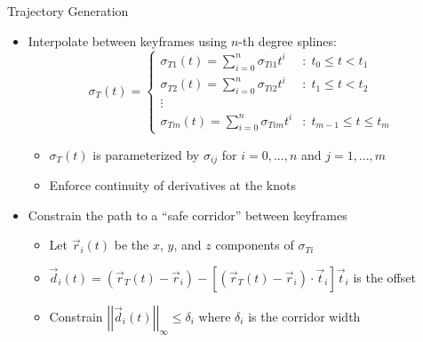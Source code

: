 \documentclass[onlymath]{beamer}
\begin{document}
\begin{frame}{Trajectory Generation}
    \begin{itemize}
    \item Interpolate between keyframes using $n$-th degree splines:
    \begin{equation*}
        \sigma_T(t) = \begin{cases}
            \sigma_{T1}(t) = \sum_{i = 0}^n \sigma_{Ti1} t^i & :\; t_0 \le t < t_1 \\
            \sigma_{T2}(t) = \sum_{i = 0}^n \sigma_{Ti2} t^i & :\; t_1 \le t < t_2 \\
            \vdots & \\
            \sigma_{Tm}(t) = \sum_{i = 0}^n \sigma_{Tim} t^i & :\; t_{m-1} \le t \le t_m
        \end{cases}
    \end{equation*}
        \begin{itemize}
        \item $\sigma_T(t)$ is parameterized by $\sigma_{ij}$ for $i = 0, ..., n$ and $j = 1, ..., m$
        \item Enforce continuity of derivatives at the knots
        \end{itemize}
    \item Constrain the path to a ``safe corridor'' between keyframes
        \begin{itemize}
        \item Let $\vec{r}_i(t)$ be the $x$, $y$, and $z$ components of $\sigma_{Ti}$
        \item $\vec{d}_i(t) = \left(\vec{r}_T(t) - \vec{r}_i\right) - \left[\left(\vec{r}_T(t) - \vec{r}_i\right) \cdot \vec{t}_i\right] \vec{t}_i$ is the offset
        \item Constrain $\left|\left| \vec{d}_i(t) \right|\right|_\infty \le \delta_i$ where $\delta_i$ is the corridor width
        \end{itemize}
    \end{itemize}
\end{frame}
\end{document}
